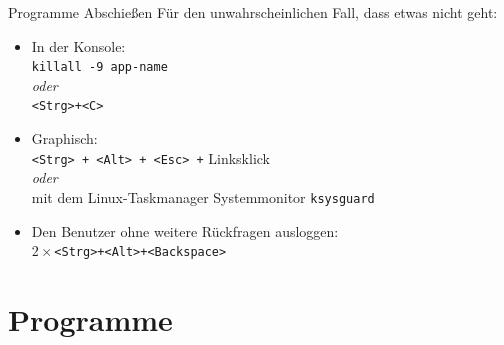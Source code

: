 \begin{frame}{Programme Abschießen}
  Für den unwahrscheinlichen Fall, dass etwas nicht geht:
  \begin{itemize}
    \item In der Konsole: \\ \texttt{killall -9 app-name} \\ \textit{oder} \\
    \texttt{<Strg>+<C>}
    \item Graphisch: \\ \texttt{<Strg> + <Alt> + <Esc> +} Linksklick \\
          \textit{oder} \\
          mit dem Linux-Taskmanager Systemmonitor \texttt{ksysguard}
    \item Den Benutzer ohne weitere Rückfragen ausloggen: \\
          $2 \times$\texttt{<Strg>+<Alt>+<Backspace>}
  \end{itemize}
\end{frame}

\section{Programme}

